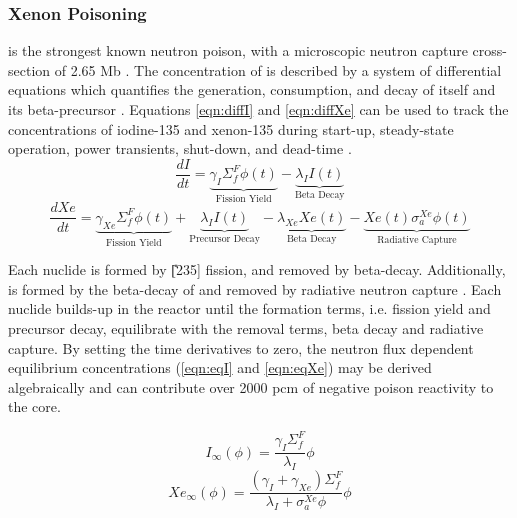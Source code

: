 \subsubsection{Xenon Poisoning}
\Xe is the strongest known neutron poison, with a microscopic neutron capture cross-section of 2.65 Mb \cite[Table II.2]{Lamarsh}. The concentration of \Xe is described by a system of differential equations which quantifies the generation, consumption, and decay of itself and its beta-precursor \I. Equations \ref{eqn:diffI} and \ref{eqn:diffXe} can be used to track the concentrations of iodine-135 and xenon-135 during start-up, steady-state operation, power transients, shut-down, and dead-time \cite[Ch. 7]{Lamarsh}.
\begin{equation}\label{eqn:diffI}
    \frac{dI}{dt} =
    \underbrace{\gamma_{I}\Sigma_{f}^{F}{\phi}(t)}_{\text{Fission Yield}}
    -\underbrace{\lambda_{I}I(t)}_{\text{Beta Decay}}
\end{equation}
\begin{equation}\label{eqn:diffXe}
        \frac{dXe}{dt} =
        \underbrace{\gamma_{Xe}\Sigma_{f}^{F}{\phi}(t)}_{\text{Fission Yield}}
        +
        \underbrace{\lambda_{I}I(t)}_{\text{Precursor Decay}}
        -
        \underbrace{\lambda_{Xe}Xe(t)}_{\text{Beta Decay}}
        -
        \underbrace{Xe(t)\sigma_{a}^{Xe}{\phi}(t)}_{\text{Radiative Capture}}
\end{equation}

Each nuclide is formed by \U[235] fission, and removed by beta-decay. Additionally, \Xe is formed by the beta-decay of \I and removed by radiative neutron capture \footnotemark. Each nuclide builds-up in the reactor until the formation terms, i.e. fission yield and precursor decay, equilibrate with the removal terms, beta decay and radiative capture. By setting the time derivatives to zero, the neutron flux dependent equilibrium concentrations (\ref{eqn:eqI} and \ref{eqn:eqXe}) may be derived algebraically \cite[Ch. 7]{Lamarsh} and can contribute over 2000 pcm of negative poison reactivity to the core. 

 
\begin{equation}\label{eqn:eqI}
    I_{\infty}(\phi) = \frac{\gamma_I \Sigma_f^F }{\lambda_I}\phi
\end{equation}
\begin{equation}\label{eqn:eqXe}
    Xe_{\infty}(\phi) = \frac{(\gamma_I+\gamma_{Xe}) \Sigma_f^F }{\lambda_I+\sigma_a^{Xe}\phi}\phi
\end{equation}


